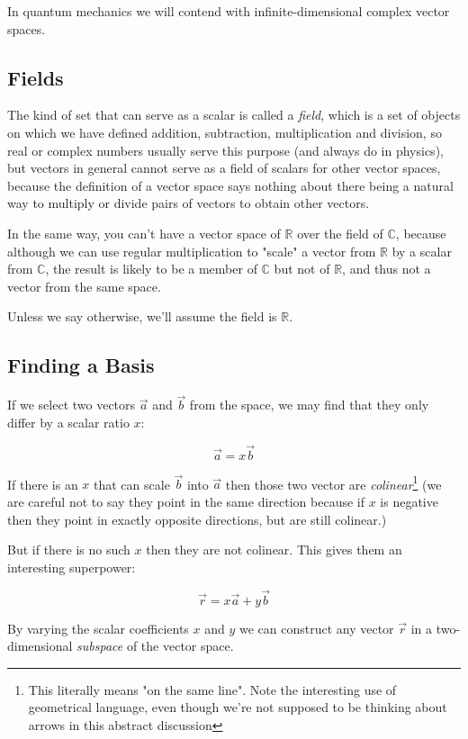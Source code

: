In quantum mechanics we will contend with infinite-dimensional complex vector spaces.

\subsection{Fields}

The kind of set that can serve as a scalar is called a \textit{field}, which is a set of objects on which we have defined addition, subtraction, multiplication and division, so real or complex numbers usually serve this purpose (and always do in physics), but vectors in general cannot serve as a field of scalars for other vector spaces, because the definition of a vector space says nothing about there being a natural way to multiply or divide pairs of vectors to obtain other vectors.

In the same way, you can't have a vector space of $\mathbb{R}$ over the field of $\mathbb{C}$, because although we can use regular multiplication to "scale" a vector from $\mathbb{R}$ by a scalar from $\mathbb{C}$, the result is likely to be a member of $\mathbb{C}$ but not of $\mathbb{R}$, and thus not a vector from the same space.

Unless we say otherwise, we'll assume the field is $\mathbb{R}$.

\subsection{Finding a Basis}

If we select two vectors $\vec{a}$ and $\vec{b}$ from the space, we may find that they only differ by a scalar ratio $x$:

$$
\vec{a} = x \vec{b}
$$

If there is an $x$ that can scale $\vec{b}$ into $\vec{a}$ then those two vector are \textit{colinear}\footnote{This literally means "on the same line". Note the interesting use of geometrical language, even though we're not supposed to be thinking about arrows in this abstract discussion} (we are careful not to say they point in the same direction because if $x$ is negative then they point in exactly opposite directions, but are still colinear.)

But if there is no such $x$ then they are not colinear. This gives them an interesting superpower:

$$
\vec{r} = x \vec{a} + y \vec{b}
$$

By varying the scalar coefficients $x$ and $y$ we can construct any vector $\vec{r}$ in a two-dimensional \textit{subspace} of the vector space.

